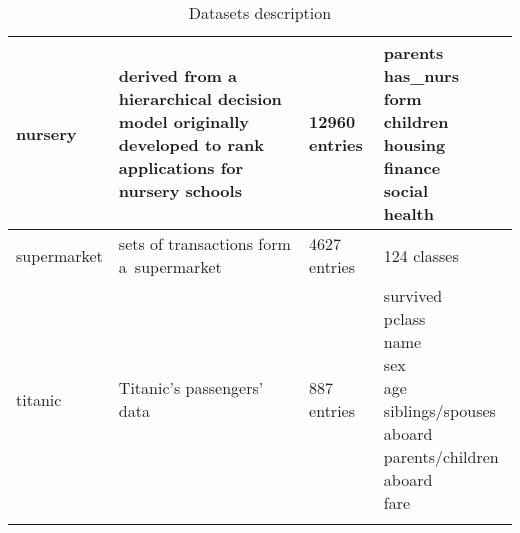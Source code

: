 \documentclass{article}
\begin{document}
\begin{longtable}{ p{} | p{}| p{}| p{} }
			\hline
			nursery& derived from a hierarchical decision model originally developed to rank applications for nursery schools & 12960 entries&\makecell{parents\\has\_nurs\\form\\children\\housing\\finance\\social\\health}\\
			\hline
			supermarket& sets of transactions form a~supermarket & 4627 entries&124 classes\\
			\hline
			titanic& Titanic's passengers' data  & 887 entries&\makecell{survived\\pclass\\name\\sex\\age\\siblings/spouses aboard\\parents/children aboard\\fare}\\
			\hline
			\caption{Datasets description}
		\end{longtable} 
\end{document}
